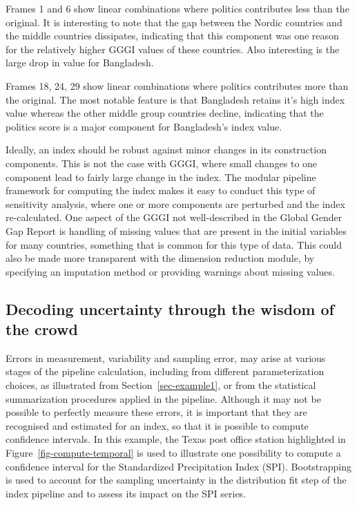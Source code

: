 \documentclass[
]{interact}
\begin{document}
Frames 1 and 6 show linear combinations where politics contributes less
than the original. It is interesting to note that the gap between the
Nordic countries and the middle countries dissipates, indicating that
this component was one reason for the relatively higher GGGI values of
these countries. Also interesting is the large drop in value for
Bangladesh.

Frames 18, 24, 29 show linear combinations where politics contributes
more than the original. The most notable feature is that Bangladesh
retains it's high index value whereas the other middle group countries
decline, indicating that the politics score is a major component for
Bangladesh's index value.

Ideally, an index should be robust against minor changes in its
construction components. This is not the case with GGGI, where small
changes to one component lead to fairly large change in the index. The
modular pipeline framework for computing the index makes it easy to
conduct this type of sensitivity analysis, where one or more components
are perturbed and the index re-calculated. One aspect of the GGGI not
well-described in the Global Gender Gap Report is handling of missing
values that are present in the initial variables for many countries,
something that is common for this type of data. This could also be made
more transparent with the dimension reduction module, by specifying an
imputation method or providing warnings about missing values.

\hypertarget{decoding-uncertainty-through-the-wisdom-of-the-crowd}{%
\subsection{Decoding uncertainty through the wisdom of the
crowd}\label{decoding-uncertainty-through-the-wisdom-of-the-crowd}}

Errors in measurement, variability and sampling error, may arise at
various stages of the pipeline calculation, including from different
parameterization choices, as illustrated from
Section~\ref{sec-example1}, or from the statistical summarization
procedures applied in the pipeline. Although it may not be possible to
perfectly measure these errors, it is important that they are recognised
and estimated for an index, so that it is possible to compute confidence
intervals. In this example, the Texas post office station highlighted in
Figure~\ref{fig-compute-temporal} is used to illustrate one possibility
to compute a confidence interval for the Standardized Precipitation
Index (SPI). Bootstrapping is used to account for the sampling
uncertainty in the distribution fit step of the index pipeline and to
assess its impact on the SPI series.
\end{document}

